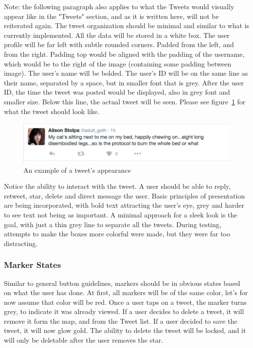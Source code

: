 \documentclass[11pt]{article}
\begin{document}
Note: the following paragraph also applies to what the Tweets would visually appear like in the "Tweets" section, and as it is written here, will not be reiterated again. The tweet organization should be minimal and similar to what is currently implemented. All the data will be stored in a white box. The user profile will be far left with subtle rounded corners. Padded from the left, and from the right. Padding top would be aligned with the padding of the username, which would be to the right of the image (containing some padding between image). The user's name will be bolded. The user's ID will be on the same line as their name, separated by a space, but in smaller font that is grey. After the user ID, the time the tweet was posted would be displayed, also in grey font and smaller size. Below this line, the actual tweet will be seen. Please see figure~\ref{fig:tweetExample} for what the tweet should look like.

\begin{figure}[H]
    \centering
    \includegraphics[width=20cm]{tweetExample}
    \caption{An example of a tweet's appearance}
    \label{fig:tweetExample}                
\end{figure}

Notice the ability to interact with the tweet. A user should be able to reply, retweet, star, delete and direct message the user. Basic principles of presentation are being incorporated, with bold text attracting the user's eye, grey and harder to see text not being as important. A minimal approach for a sleek look is the goal, with just a thin grey line to separate all the tweets. During testing, attempts to make the boxes more colorful were made, but they were far too distracting.

\subsubsection{Marker States}
Similar to general button guidelines, markers should be in obvious states based on what the user has done. At first, all markers will be of the same color, let's for now assume that color will be red. Once a user taps on a tweet, the marker turns grey, to indicate it was already viewed. If a user decides to delete a tweet, it will remove it form the map, and from the Tweet list. If a user decided to save the tweet, it will now glow gold. The ability to delete the tweet will be locked, and it will only be deletable after the user removes the star.
\end{document}
